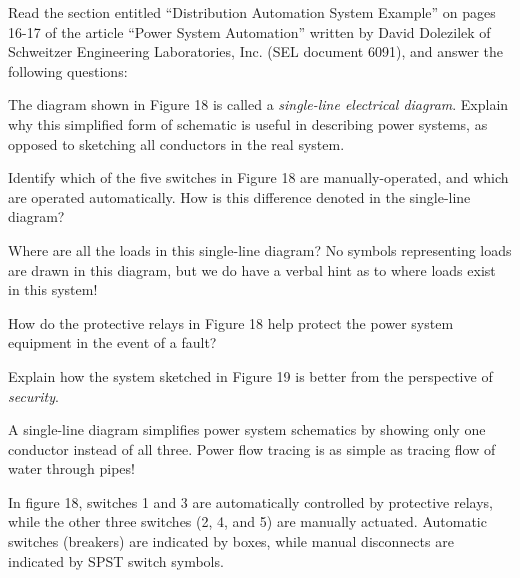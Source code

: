 

Read the section entitled ``Distribution Automation System Example'' on pages 16-17 of the article ``Power System Automation'' written by David Dolezilek of Schweitzer Engineering Laboratories, Inc. (SEL document 6091), and answer the following questions:

\vskip 10pt

The diagram shown in Figure 18 is called a {\it single-line electrical diagram}.  Explain why this simplified form of schematic is useful in describing power systems, as opposed to sketching all conductors in the real system.

\vskip 10pt

Identify which of the five switches in Figure 18 are manually-operated, and which are operated automatically.  How is this difference denoted in the single-line diagram?

\vskip 10pt

Where are all the loads in this single-line diagram?  No symbols representing loads are drawn in this diagram, but we do have a verbal hint as to where loads exist in this system!

\vskip 10pt

How do the protective relays in Figure 18 help protect the power system equipment in the event of a fault?

\vskip 10pt

Explain how the system sketched in Figure 19 is better from the perspective of {\it security}.














A single-line diagram simplifies power system schematics by showing only one conductor instead of all three.  Power flow tracing is as simple as tracing flow of water through pipes!

\vskip 10pt

In figure 18, switches 1 and 3 are automatically controlled by protective relays, while the other three switches (2, 4, and 5) are manually actuated.  Automatic switches (breakers) are indicated by boxes, while manual disconnects are indicated by SPST switch symbols.

